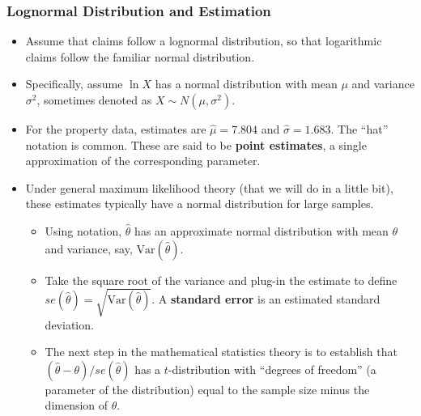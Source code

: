 \documentclass{beamer}
\begin{document}
\begin{frame}[shrink=2]
\frametitle{Lognormal Distribution and Estimation}
\begin{itemize}
\item Assume that claims follow a lognormal distribution, so that logarithmic claims follow the familiar normal distribution.
\item Specifically, assume $\ln X$ has a normal distribution with mean $\mu$ and variance $\sigma^2$, sometimes denoted as $X \sim N(\mu, \sigma^2)$.
\item For the property data, estimates are $\hat{\mu} =7.804$ and $\hat{\sigma} = 1.683$. The ``hat'' notation is common. These are said to be \textbf{point estimates}, a single approximation of the corresponding parameter.
\item Under general maximum likelihood theory (that we will do in a little bit), these estimates typically have a normal distribution for large samples.
\begin{itemize}
\item Using notation, $\hat{\theta}$ has an approximate normal distribution with mean $\theta$ and variance, say, $\mathrm{Var}(\hat{\theta})$.
\item Take the square root of the variance and plug-in the estimate to define $se(\hat{\theta}) = \sqrt{\mathrm{Var}(\hat{\theta})}$. A \textbf{standard error} is an estimated standard deviation.
\item The next step in the mathematical statistics theory is to establish that $ (\hat{\theta}-\theta)/se(\hat{\theta})$
has a $t$-distribution with ``degrees of freedom'' (a parameter of the distribution) equal to the sample size minus the dimension of  $\theta$.
\end{itemize}
\end{itemize}
\end{frame}
\end{document}
